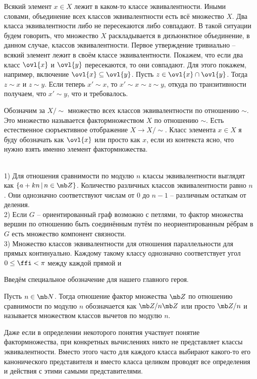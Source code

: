 \fct Всякий элемент $x\in X$ лежит в каком-то классе эквивалентности.  Иными словами, объединение всех классов эквивалентности есть всё множество $X$.  Два класса эквивалентности либо не пересекаются либо совпадают. В такой ситуации будем говорить, что множество $X$ раскладывается в дизъюнктное объединение, в данном случае, классов эквивалентности.
\efct
\proof Первое утверждение тривиально -- всякий элемент лежит в своём классе эквивалентности. Покажем, что если два класс $\ovl{x}$  и $\ovl{y}$ пересекаются, то они совпадают. Для этого покажем, например, включение $\ovl{x}\subseteq \ovl{y}$. Пусть $z\in \ovl{x}\cap \ovl{y}$. Тогда $z\sim x$ и $z\sim y$. Если теперь $x' \sim x$, то $x'\sim x\sim z\sim y$, откуда по транзитивности получаем, что $x'\sim y$, что  и требовалось.
\endproof

\dfn Обозначим за $X/\!\sim$ множество всех классов эквивалентности по отношению $\sim$. Это множество называется фактормножеством $X$ по отношению $\sim$. Есть естественное сюръективное отображение $X\to X/\!\sim$. Класс элемента $x\in X$ я буду обозначать как $\ovl{x}$ или просто как $x$, если из контекста ясно, что нужно взять именно элемент фактормножества.
\edfn

\exm\\
1) Для отношения сравнимости по модулю $n$ классы эквивалентности выглядят как $\{a+kn\,|\, n \in \mb Z\}$. Количество различных классов эквивалентности равно $n$. Они однозначно соответствуют числам от $0$ до $n-1$ -- различным остаткам от деления.\\
2) Если $G$ -- ориентированный граф возможно с петлями, то фактор множества вершин по отношению быть соединённым путём по неориентированным рёбрам в $G$ есть множество компонент связности.\\
3) Множество классов эквивалентности для отношения параллельности для прямых континуально. Каждому такому классу однозначно соответствует угол $0\leq \ffi<\pi $ между каждой прямой и 


Введём специальное обозначение для нашего главного героя.

\dfn Пусть $n\in \mb N$. Тогда отношение фактор множества $\mb Z$ по отношению сравнимости по модулю $n$ обозначается как $\mb Z/n\mb Z$ или просто $\mb Z/n$ и называется множеством классов вычетов по модулю $n$.
\edfn

Даже если в определении некоторого понятия участвует понятие фактормножества, при конкретных вычислениях никто не представляет классы эквивалентности. Вместо этого часто для каждого класса выбирают какого-то его канонического представителя и вместо класса целиком проводят все определения и действия с этими самыми представителями. 

